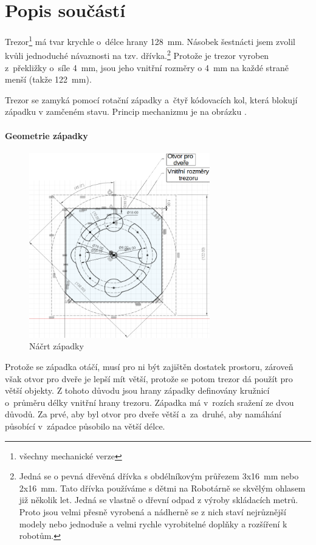 \section{Popis součástí}

Trezor\footnote{všechny mechanické verze} má tvar krychle o~délce hrany 128~mm. Násobek šestnácti jsem zvolil kvůli jednoduché návaznosti na tzv. dřívka.\footnote
{  
    Jedná se o pevná dřevěná dřívka s obdélníkovým průřezem 3x16~mm nebo 2x16~mm. Tato dřívka používáme s dětmi na Robotárně se skvělým ohlasem již několik 
    let. Jedná se vlastně o dřevní odpad z výroby skládacích metrů. Proto jsou velmi přesně vyrobená a nádherně se z nich staví nejrůznější modely nebo 
    jednoduše a velmi rychle vyrobitelné doplňky a rozšíření k robotům.
}
Protože je trezor vyroben z~překližky o~síle 4~mm, jsou jeho vnitřní rozměry o 4~mm na každé straně menší (takže 122~mm).

Trezor se zamyká pomocí rotační západky a~čtyř kódovacích kol, která blokují západku v zamčeném stavu. 
Princip mechanizmu je na obrázku .

\paragraph{Geometrie západky}
\begin{figure}[h]
	\centering
    \includegraphics[width=0.7\textwidth]{kapitoly/obrazky/M3/geometrie_zapadky.png}
    \caption{Náčrt západky}
    \label{fig:M3-geometrie-zapadky}
\end{figure} 

Protože se západka otáčí, musí pro ni být zajištěn dostatek prostoru, zároveň však otvor pro dveře je lepší mít větší, protože se potom trezor dá použít pro větší objekty.
Z tohoto důvodu jsou hrany západky definovány kružnicí o~průměru délky vnitřní hrany trezoru. Západka má v~rozích sražení ze dvou důvodů. Za prvé, aby byl otvor pro
dveře větší a~za~druhé, aby namáhání působící v~západce působilo na větší délce.


